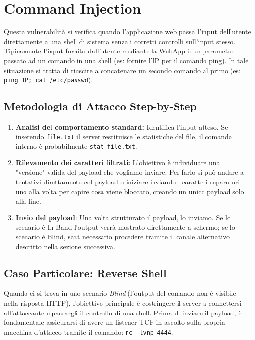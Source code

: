 \documentclass[12pt,a4paper]{report}
\begin{document}
	\section{Command Injection}
	
	Questa vulnerabilità si verifica quando l'applicazione web passa l'input dell'utente direttamente a una shell di sistema senza i corretti controlli sull'input stesso.
	\\
	Tipicamente l'input fornito dall'utente mediante la WebApp è un parametro passato ad un comando in una shell (es: fornire l'IP per il comando ping). In tale situazione si tratta di riuscire a concatenare un secondo comando al primo (es: \texttt{ping IP; cat /etc/passwd}).
	
	\subsection{Metodologia di Attacco Step-by-Step}
	
	\begin{enumerate}
		\item \textbf{Analisi del comportamento standard:} Identifica l'input atteso. Se inserendo \texttt{file.txt} il server restituisce le statistiche del file, il comando interno è probabilmente \texttt{stat file.txt}.
		\item \textbf{Rilevamento dei caratteri filtrati:} L'obiettivo è individuare una "versione" valida del payload che vogliamo inviare. Per farlo si può andare a tentativi direttamente col payload o iniziare inviando i caratteri separatori uno alla volta per capire cosa viene bloccato, creando un unico payload solo alla fine.
		\item \textbf{Invio del payload:}
		Una volta strutturato il payload, lo inviamo. Se lo scenario è In-Band l'output verrà mostrato direttamente a schermo; se lo scenario è Blind, sarà necessario procedere tramite il canale alternativo descritto nella sezione successiva.
	\end{enumerate}
	
	\subsection{Caso Particolare: Reverse Shell}
	
	Quando ci si trova in uno scenario \textit{Blind} (l'output del comando non è visibile nella risposta HTTP), l'obiettivo principale è costringere il server a connettersi all'attaccante e passargli il controllo di una shell. Prima di inviare il payload, è fondamentale assicurarsi di avere un listener TCP in ascolto sulla propria macchina d'attacco tramite il comando: \texttt{nc -lvnp 4444}.
	
\end{document}
